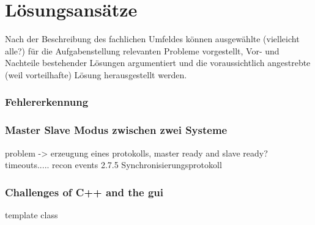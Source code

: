 \chapter{Lösungsansätze}
Nach der Beschreibung des fachlichen Umfeldes können ausgewählte (vielleicht alle?) für die Aufgabenstellung relevanten Probleme vorgestellt, Vor- und Nachteile bestehender Lösungen argumentiert und die voraussichtlich angestrebte (weil vorteilhafte) Lösung herausgestellt werden.

\subsection{Fehlererkennung}

\subsection{Master Slave Modus zwischen zwei Systeme}
problem -> erzeugung eines protokolls, master ready and slave ready?
timeouts.....
recon events
2.7.5 Synchronisierungsprotokoll

\subsection{Challenges of C++ and the gui}
template class\\